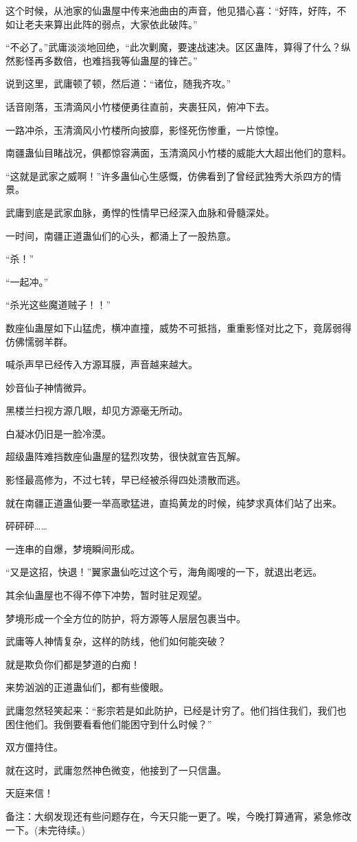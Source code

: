 \begin{this_body}
这个时候，从池家的仙蛊屋中传来池曲由的声音，他见猎心喜：“好阵，好阵，不如让老夫来算出此阵的弱点，大家依此破阵。”

“不必了。”武庸淡淡地回绝，“此次剿魔，要速战速决。区区蛊阵，算得了什么？纵然影怪再多数倍，也难挡我等仙蛊屋的锋芒。”

说到这里，武庸顿了顿，然后道：“诸位，随我齐攻。”

话音刚落，玉清滴风小竹楼便勇往直前，夹裹狂风，俯冲下去。

一路冲杀，玉清滴风小竹楼所向披靡，影怪死伤惨重，一片惊惶。

南疆蛊仙目睹战况，俱都惊容满面，玉清滴风小竹楼的威能大大超出他们的意料。

“这就是武家之威啊！”许多蛊仙心生感慨，仿佛看到了曾经武独秀大杀四方的情景。

武庸到底是武家血脉，勇悍的性情早已经深入血脉和骨髓深处。

一时间，南疆正道蛊仙们的心头，都涌上了一股热意。

“杀！”

“一起冲。”

“杀光这些魔道贼子！！”

数座仙蛊屋如下山猛虎，横冲直撞，威势不可抵挡，重重影怪对比之下，竟孱弱得仿佛懦弱羊群。

喊杀声早已经传入方源耳膜，声音越来越大。

妙音仙子神情微异。

黑楼兰扫视方源几眼，却见方源毫无所动。

白凝冰仍旧是一脸冷漠。

超级蛊阵难挡数座仙蛊屋的猛烈攻势，很快就宣告瓦解。

影怪最高修为，不过七转，早已经被杀得四处溃散而逃。

就在南疆正道蛊仙要一举高歌猛进，直捣黄龙的时候，纯梦求真体们站了出来。

砰砰砰……

一连串的自爆，梦境瞬间形成。

“又是这招，快退！”翼家蛊仙吃过这个亏，海角阁嗖的一下，就退出老远。

其余仙蛊屋也不得不停下冲势，暂时驻足观望。

梦境形成一个全方位的防护，将方源等人层层包裹当中。

武庸等人神情复杂，这样的防线，他们如何能突破？

就是欺负你们都是梦道的白痴！

来势汹汹的正道蛊仙们，都有些傻眼。

武庸忽然轻笑起来：“影宗若是如此防护，已经是计穷了。他们挡住我们，我们也困住他们。我倒要看看他们能困守到什么时候？”

双方僵持住。

就在这时，武庸忽然神色微变，他接到了一只信蛊。

天庭来信！

备注：大纲发现还有些问题存在，今天只能一更了。唉，今晚打算通宵，紧急修改一下。(未完待续。)

\end{this_body}


